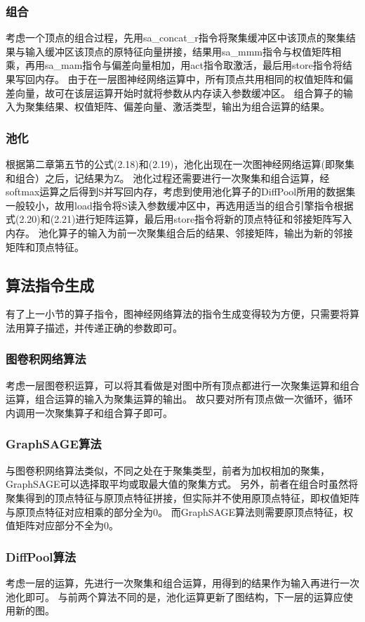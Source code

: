 \subsubsection{组合}
考虑一个顶点的组合过程，先用sa\_concat\_r指令将聚集缓冲区中该顶点的聚集结果与输入缓冲区该顶点的原特征向量拼接，结果用sa\_mmm指令与权值矩阵相乘，再用sa\_mam指令与偏差向量相加，用act指令取激活，最后用store指令将结果写回内存。
由于在一层图神经网络运算中，所有顶点共用相同的权值矩阵和偏差向量，故可在该层运算开始时就将参数从内存读入参数缓冲区。
组合算子的输入为聚集结果、权值矩阵、偏差向量、激活类型，输出为组合运算的结果。

\subsubsection{池化}
根据第二章第五节的公式(2.18)和(2.19)，池化出现在一次图神经网络运算(即聚集和组合）之后，记结果为Z。
池化过程还需要进行一次聚集和组合运算，经softmax运算之后得到S并写回内存，考虑到使用池化算子的DiffPool所用的数据集一般较小，故用load指令将S读入参数缓冲区中，再选用适当的组合引擎指令根据式(2.20)和(2.21)进行矩阵运算，最后用store指令将新的顶点特征和邻接矩阵写入内存。
池化算子的输入为前一次聚集组合后的结果、邻接矩阵，输出为新的邻接矩阵和顶点特征。

\subsection{算法指令生成}
有了上一小节的算子指令，图神经网络算法的指令生成变得较为方便，只需要将算法用算子描述，并传递正确的参数即可。

\subsubsection{图卷积网络算法}
考虑一层图卷积运算，可以将其看做是对图中所有顶点都进行一次聚集运算和组合运算，组合运算的输入为聚集运算的输出。
故只要对所有顶点做一次循环，循环内调用一次聚集算子和组合算子即可。

\subsubsection{GraphSAGE算法}
与图卷积网络算法类似，不同之处在于聚集类型，前者为加权相加的聚集，GraphSAGE可以选择取平均或取最大值的聚集方式。
另外，前者在组合时虽然将聚集得到的顶点特征与原顶点特征拼接，但实际并不使用原顶点特征，即权值矩阵与原顶点特征对应相乘的部分全为0。
而GraphSAGE算法则需要原顶点特征，权值矩阵对应部分不全为0。

\subsubsection{DiffPool算法}
考虑一层的运算，先进行一次聚集和组合运算，用得到的结果作为输入再进行一次池化即可。
与前两个算法不同的是，池化运算更新了图结构，下一层的运算应使用新的图。

